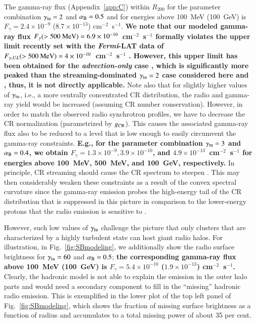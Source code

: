 \documentclass[useAMS,usenatbib]{mn2e}
\begin{document}
The gamma-ray flux (Appendix~\ref{app:C}) within $R_{200}$ for the parameter
combination $\gamma_{{\mathrm{tu}}} = 2$ and $\alpha_{{\mathrm{B}}}=0.5$ and for energies
above 100~MeV (100~GeV) is $F_{\gamma} = 2.4 \times 10^{-9}$ ($8.7 \times
10^{-13}$) cm$^{-2}$~s$^{-1}$.  {\bf We note that our modeled gamma-ray flux
  $F_{\gamma} (>500~{\mathrm{MeV}}) = 6.9 \times10^{-10}$~cm$^{-2}$~s$^{-1}$ formally
  violates the upper limit recently set with the \emph{Fermi}-LAT data of
  $F_{\gamma, UL} (>500~{\mathrm{MeV}}) = 4 \times 10^{-10}$~cm$^{-2}$~s$^{-1}$
  \citep{2013arXiv1308.5654T}.  However, this upper limit has been obtained for
  the {\em advection-only} case \citep{2010MNRAS.409..449P}, which is
  significantly more peaked than the streaming-dominated $\gamma_{{\mathrm{tu}}} = 2$
  case considered here and , thus, it is not directly applicable.}  Note also
that for slightly higher values of $\gamma_{{\mathrm{tu}}}$, i.e., a more centrally
concentrated CR distribution, the radio and gamma-ray yield would be increased
(assuming CR number conservation). However, in order to match the observed radio
synchrotron profiles, we have to decrease the CR normalization (parametrized by
$g_{{\mathrm{CR}}}$). This causes the associated gamma-ray flux also to be reduced to
a level that is low enough to easily circumvent the gamma-ray constraints.  {\bf
  E.g., for the parameter combination $\gamma_{{\mathrm{tu}}} = 3$ and
  $\alpha_{{\mathrm{B}}}=0.4$, we obtain $F_{\gamma} = 1.3 \times 10^{-9}, 3.9 \times
  10^{-10}$, and $4.9 \times 10^{-13}$~cm$^{-2}$~s$^{-1}$ for energies above
  100~MeV, 500~MeV, and 100~GeV, respectively.}  In principle, CR streaming
should cause the CR spectrum to steepen \citep{2013arXiv1303.4746W}.  This may
then considerably weaken these constraints as a result of the convex spectral
curvature since the gamma-ray emission probes the high-energy tail of the CR
distribution that is suppressed in this picture in comparison to the
lower-energy protons that the radio emission is sensitive to \citep[see][for an
extended discussion of this point]{2011arXiv1111.5544M}.

However, such low values of $\gamma_{{\mathrm{tu}}}$ challenge the picture
that only clusters that are characterized by a highly turbulent state can host
giant radio halos. For illustration, in Fig.~\ref{fig:SBmodeling}, we
additionally show the radio surface brightness for $\gamma_{{\mathrm{tu}}} = 60$ and
$\alpha_{{\mathrm{B}}}=0.5$; {\bf the corresponding gamma-ray flux above 100~MeV 
(100~GeV) is $F_{\gamma} = 5.4 \times 10^{-10}$ ($1.9 \times
10^{-13}$) cm$^{-2}$~s$^{-1}$.} 
Clearly, the hadronic model is not able to explain the
emission in the outer halo parts and would need a secondary component to fill in
the ``missing'' hadronic radio emission. This is exemplified in the lower plot of
the top left panel of Fig.~\ref{fig:SBmodeling}, which shows the fraction of
missing surface brightness as a function of radius and accumulates to a total
missing power of about 35 per cent.
\end{document}
